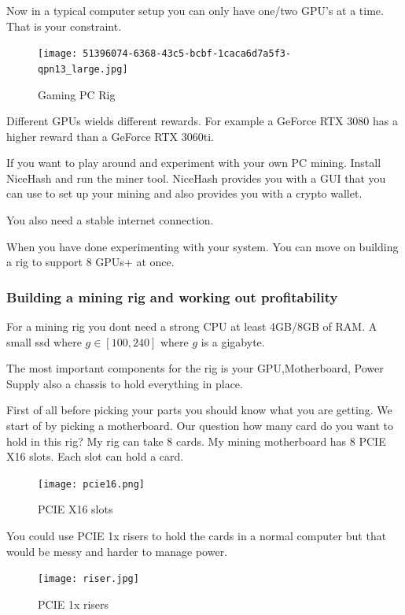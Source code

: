 Now in a typical computer setup you can only have one/two GPU's at a time. That is your constraint.

\begin{figure}[H]
\centering
\texttt{[image: 51396074-6368-43c5-bcbf-1caca6d7a5f3-qpn13\_large.jpg]}
\caption{Gaming PC Rig}
\label{fig:pc}
\end{figure}


Different GPUs wields different rewards. For example a GeForce RTX 3080 has a higher reward than a GeForce RTX 3060ti.

If you want to play around and experiment with your own PC mining. Install NiceHash and run the miner tool. NiceHash provides you with a GUI that you can use to set up your mining and also provides you with a crypto wallet.

You also need a stable internet connection.

When you have done experimenting with your system. You can move on building a rig to support 8 GPUs+ at once.

\subsubsection{Building a mining rig and working out profitability} 

For a mining rig you dont need a strong CPU at least 4GB/8GB of RAM. A small ssd where $g \in [100,240]$ where $g$ is a gigabyte.

The most important components for the rig is your GPU,Motherboard, Power Supply also a chassis to hold everything in place.

First of all before picking your parts you should know what you are getting.
We start of by picking a motherboard. Our question how many card do you want to hold in this rig?
My rig can take 8 cards. My mining motherboard has 8 PCIE X16 slots. Each slot can hold a card.

\begin{figure}[H]
\centering
\texttt{[image: pcie16.png]}
\caption{PCIE X16 slots}
\label{fig:pcie16}
\end{figure}

You could use PCIE 1x risers to hold the cards in a normal computer but that would be messy and harder to manage power.

\begin{figure}[H]
\centering
\texttt{[image: riser.jpg]}
\caption{PCIE 1x risers}
\label{fig:pcie1x}
\end{figure}



